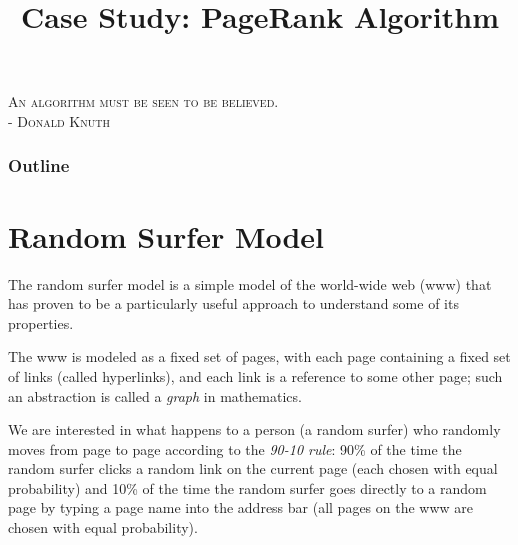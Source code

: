 \documentclass[8pt,a4paper,compress,handout]{beamer}
\title{Case Study: PageRank Algorithm}
\date{}
\begin{document}
\begin{frame}
\begin{flushright}
\tiny \textsc{An algorithm must be seen to be believed. \\ - Donald Knuth}
\end{flushright}
\titlepage
\end{frame}

\begin{frame}
\frametitle{Outline}
\tableofcontents
\end{frame}

\section{Random Surfer Model}
\begin{frame}[fragile]
\pause

The random surfer model is a simple model of the world-wide web (www) that has proven to be a particularly useful approach to understand some of its properties.

\bigskip

The www is modeled as a fixed set of pages, with each page containing a fixed set of links (called hyperlinks), and each link is a reference to some other page; such an abstraction is called a \textit{graph} in mathematics.

\bigskip

We are interested in what happens to a person (a random surfer) who randomly moves from page to page according to the \emph{90-10 rule}: 90\% of the time the random surfer clicks a random link on the current page (each chosen with equal probability) and 10\% of the time the random surfer goes directly to a random page by typing a page name into the address bar (all pages on the www are chosen with equal probability).
\end{frame}
\end{document}
